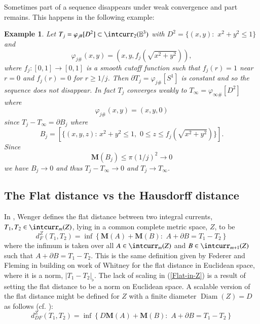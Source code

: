 \documentclass[12pt]{amsart}
\newtheorem{example}[thm]{Example}
\begin{document}
Sometimes part of a sequence disappears under weak convergence
and part remains.  This happens in the following example:

\begin{example} \label{one-spline-to-disk}
Let $T_j = \varphi_{j\#}[D^2]  \subset \intcurr_2({\mathbb{E}}^3)$ with
$
D^2=\{(x,y):\,\, x^2+y^2 \le 1\}
$
and
\begin{equation}
\varphi_{j\#}(x,y)=(x,y, f_j(\sqrt{x^2+y^2})),
\end{equation}
where $f_j:[0,1]\to [0,1]$ is a smooth cutoff function such that $f_j(r)=1$
near $r=0$ and $f_j(r)=0$ for $r\ge 1/j$.  Then 
$\partial T_j = \varphi_{j\#}[S^1]$ is constant and so the sequence 
does not disappear.   In fact $T_j$ converges weakly to
$T_\infty=\varphi_{\infty\#}[D^2]$ where
\begin{equation}
\varphi_{j\#}(x,y)=(x,y, 0)
\end{equation}
since $T_j-T_\infty= \partial B_j$ where
\begin{equation} \label{Bj2}
B_j= [\{(x,y,z): \, x^2+y^2 \le 1,\,\, 0\le z \le f_j(\sqrt{x^2+y^2})\}].
\end{equation}
Since 
\begin{equation} \label{Bjmass}
{{\mathbf M}}(B_j) \le \pi (1/j)^2 \to 0
\end{equation}
we have $B_j \to 0$ and thus $T_j - T_\infty \to 0$ and $T_j \to T_\infty$.
\end{example}

\subsection{The Flat distance vs the Hausdorff distance}\label{subsect-H}

In \cite{Wenger-flat}, Wenger defines the flat distance between 
two integral currents, $T_1, T_2\in \intcurr_m(Z)$, lying in a common complete
metric space, $Z$, to be
\begin{equation} \label{Flat-in-Z}
d_F^Z\left(T_1,T_2\right)
= \inf\left\{ {{\mathbf M}}(A) +{{\mathbf M}}(B):\,\, A+\partial B= T_1-T_2 \right\}
\end{equation}
where the infimum is taken over all $A \in \intcurr_m(Z)$ and $B \in \intcurr_{m+1}(Z)$
such that $A+\partial B= T_1-T_2$.  This is the same definition 
given by
Federer and Fleming in \cite{FF} building on work of Whitney \cite{Whitney}
for the flat distance in Euclidean
space, where it is a norm, $|T_1-T_2|_\flat$.   The lack of scaling in
(\ref{Flat-in-Z}) is a result of setting the flat distance to be a norm on Euclidean
space.   A scalable version of the flat distance might be defined for
$Z$ with a finite diameter ${\operatorname{Diam}}(Z)=D$ as follows (cf. \cite{LeFloch-Sormani-1}):
\begin{equation} \label{Flat-in-Z}
d_{DF}^Z\left(T_1,T_2\right)
= \inf\left\{ D {{\mathbf M}}(A) +{{\mathbf M}}(B):\,\, A+\partial B= T_1-T_2 \right\}
\end{equation}
\end{document}

